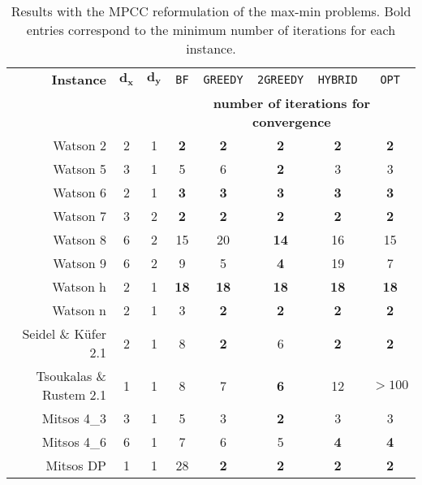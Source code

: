 \documentclass{article}
\newcommand{\1}[1]{\mathds{1}\left[#1\right]}
\begin{document}
\begin{table}[t]
\centering
\begin{tabular}{rccccccc}
\hline
\textbf{Instance}     & $\mathbf{d_x}$ & $\mathbf{d_y}$ &  \texttt{BF}            & \texttt{GREEDY}        & \texttt{2GREEDY}       & \texttt{HYBRID}    & \texttt{OPT}   \\
            &    &    &  \multicolumn{5}{c}{\textbf{number of iterations for convergence}} \\ \hline
Watson 2    & 2 & 1  & \textbf{2}                 & \textbf{2}            & \textbf{2}           & \textbf{2}             & \textbf{2}  \\
Watson 5    & 3  & 1  & 5            & 6            & \textbf{2}           & 3             & 3 \\
Watson 6    & 2  & 1  & \textbf{3}             & \textbf{3}            & \textbf{3}           & \textbf{3}             & \textbf{3}  \\
Watson 7    & 3 & 2  & \textbf{2}                 & \textbf{2}            & \textbf{2}           & \textbf{2}             & \textbf{2}  \\
Watson 8    & 6  & 2  & 15            & 20            & \textbf{14}           & 16            & 15 \\
Watson 9    & 6  & 2  & 9            & 5   & \textbf{4}           & 19       &   7 \\
Watson h    & 2  & 1  & \textbf{18}            &  \textbf{18}         &  \textbf{18}             &  \textbf{18}        &    \textbf{18}       \\
Watson n    & 2  & 1  & {3}                &\textbf{2}                & \textbf{2}           & \textbf{2}     & \textbf{2}                 \\
Seidel \& K{\"u}fer 2.1      & 2  & 1  & 8            & \textbf{2}            & 6          & \textbf{2}  & \textbf{2}        \\
Tsoukalas \& Rustem 2.1        & 1  & 1  & 8            & {7}            & \textbf{6}           & {12}            & $>100$     \\
Mitsos 4\_3 & 3  & 1  & 5            & 3            & \textbf{2}           & 3
          & 3   \\
Mitsos 4\_6 & 6  & 1  & 7            & 6           & 5           & \textbf{4}             & \textbf{4}  \\
Mitsos DP   & 1  & 1  & 28            & \textbf{2}             & \textbf{2}            & \textbf{2}    & \textbf{2}              \\
\hline
\end{tabular}
\caption{Results with the MPCC reformulation of the max-min problems.
Bold entries correspond to the minimum number of iterations for each instance.
}
\label{tab:resul-mpcc}
\end{table}
\end{document}
